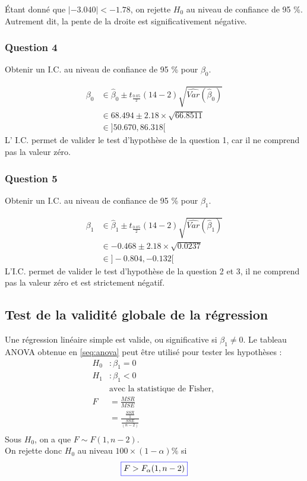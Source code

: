 \documentclass[11pt,french]{report}
\begin{document}
Étant donné que $|-3.040| < -1.78$, on rejette $H_0$ au niveau de confiance de 95 \%. Autrement dit, la pente de la droite est significativement négative.

\subsubsection*{Question 4}
Obtenir un I.C. au niveau de confiance de 95 \% pour $\beta_0$.

\begin{align*}
\beta_0 &\in \hat{\beta}_0 \pm t_{\frac{0.05}{2}}(14-2)\sqrt{\widehat{Var}(\hat{\beta}_0)} \\
& \in 68.494 \pm 2.18 \times \sqrt{66.8511} \\
&\in \big] 50.670, 86.318 \big[
\end{align*}
L' I.C. permet de valider le test d'hypothèse de la question 1, car il ne comprend pas la valeur zéro.

\subsubsection*{Question 5}
Obtenir un I.C. au niveau de confiance de 95 \% pour $\beta_1$.

\begin{align*}
\beta_1 &\in \hat{\beta}_1 \pm t_{\frac{0.05}{2}}(14-2)\sqrt{\widehat{Var}(\hat{\beta}_1)} \\
& \in -0.468 \pm 2.18 \times \sqrt{0.0237} \\
&\in \big] -0.804, -0.132 \big[
\end{align*}
L'I.C. permet de valider le test d'hypothèse de la question 2 et 3, il ne comprend pas la valeur zéro et est strictement négatif.

\subsection{Test de la validité globale de la régression}
Une régression linéaire simple est valide, ou significative si $\beta_1 \neq 0$. Le tableau ANOVA obtenue en \ref{seq:anova} peut être utilisé pour tester les hypothèses :
\begin{align*}
H_0 &: \beta_1 = 0\\
H_1 &: \beta_1 < 0 \\
&\text{avec la statistique de Fisher, } \\
F &= \frac{MSR}{MSE} \\
&= \frac{\frac{SSR}{1}}{\frac{SSE}{(n-2)}} \\
\end{align*}
Sous $H_0$, on a que $F \sim F(1, n-2)$. \\
On rejette donc $H_0$ au niveau $100 \times (1 - \alpha) \%$ si
\begin{equation}
\label{eq:fisher}
\color{blue}
\boxed{\color{black}
F > F_{\alpha}(1, n-2)}
\end{equation}
\end{document}
